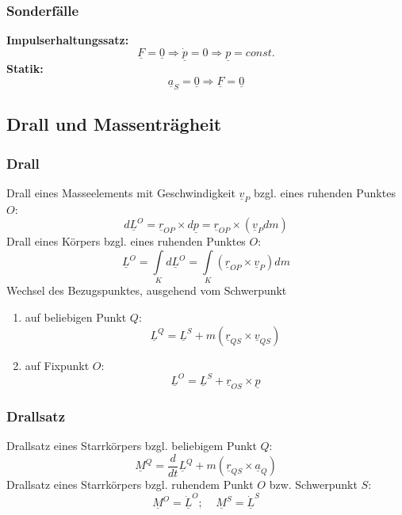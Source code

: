 \documentclass[a4paper,twocolumn,10pt]{article}
\begin{document}
\subsubsection{Sonderfälle}
\textbf{Impulserhaltungssatz:}
\begin{equation*}
\underline{F}=\underline{0}\Rightarrow \underline{\dot{p}}=0\Rightarrow\underline{p}=const.
\end{equation*}
\textbf{Statik:}
\begin{equation*}
\underline{a}_S=\underline{0}\Rightarrow\underline{F}=\underline{0}
\end{equation*}

\subsection{Drall und Massenträgheit}

\subsubsection{Drall}
Drall eines Masseelements mit Geschwindigkeit $\underline{v}_P$ bzgl. eines ruhenden Punktes $O$:
\begin{equation*}
d\underline{L}^{O}=\underline{r}_{OP}\times d\underline{p}=\underline{r}_{OP}\times(\underline{v}_Pdm)
\end{equation*}
Drall eines Körpers bzgl. eines ruhenden Punktes $O$:
\begin{equation*}
\underline{L}^{O}=\int\limits_Kd\underline{L}^{O}=\int\limits_K(\underline{r}_{OP}\times\underline{v}_P)dm
\end{equation*}
Wechsel des Bezugspunktes, ausgehend vom Schwerpunkt
\begin{enumerate}[label=$\bullet$]
\item auf beliebigen Punkt $Q$:
\begin{equation*}
\underline{L}^Q=\underline{L}^S+m(\underline{r}_{QS}\times\underline{v}_{QS})
\end{equation*}
\item auf Fixpunkt $O$:
\begin{equation*}
\underline{L}^{O}=\underline{L}^S+\underline{r}_{OS}\times \underline{p}
\end{equation*}
\end{enumerate}

\subsubsection{Drallsatz}
Drallsatz eines Starrkörpers bzgl. beliebigem Punkt $Q$:
\begin{equation*}
\underline{M}^Q=\frac{d}{dt}\underline{L}^Q+m(\underline{r}_{QS}\times\underline{a}_Q)
\end{equation*}
Drallsatz eines Starrkörpers bzgl. ruhendem Punkt $O$ bzw. Schwerpunkt $S$:
\begin{equation*}
\underline{M}^{O}=\underline{\dot{L}}^{O};\;\;\;\;\underline{M}^S=\underline{\dot{L}}^S
\end{equation*}
\end{document}
